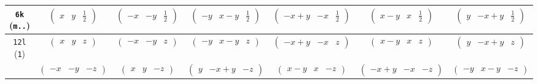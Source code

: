 \documentclass[fleqn,9pt,landscape]{jsarticle}
\begin{document}
\begin{center}
\begin{longtable}{ccccccc}
{\tt 6k} ({\tt m..}) & $ \begin{pmatrix} x & y & \frac{1}{2} \end{pmatrix} $ & $ \begin{pmatrix} - x & - y & \frac{1}{2} \end{pmatrix} $ & $ \begin{pmatrix} - y & x - y & \frac{1}{2} \end{pmatrix} $ & $ \begin{pmatrix} - x + y & - x & \frac{1}{2} \end{pmatrix} $ & $ \begin{pmatrix} x - y & x & \frac{1}{2} \end{pmatrix} $ & $ \begin{pmatrix} y & - x + y & \frac{1}{2} \end{pmatrix} $ \\ \hline
{\tt 12l} ({\tt 1}) & $ \begin{pmatrix} x & y & z \end{pmatrix} $ & $ \begin{pmatrix} - x & - y & z \end{pmatrix} $ & $ \begin{pmatrix} - y & x - y & z \end{pmatrix} $ & $ \begin{pmatrix} - x + y & - x & z \end{pmatrix} $ & $ \begin{pmatrix} x - y & x & z \end{pmatrix} $ & $ \begin{pmatrix} y & - x + y & z \end{pmatrix} $ \\
& $ \begin{pmatrix} - x & - y & - z \end{pmatrix} $ & $ \begin{pmatrix} x & y & - z \end{pmatrix} $ & $ \begin{pmatrix} y & - x + y & - z \end{pmatrix} $ & $ \begin{pmatrix} x - y & x & - z \end{pmatrix} $ & $ \begin{pmatrix} - x + y & - x & - z \end{pmatrix} $ & $ \begin{pmatrix} - y & x - y & - z \end{pmatrix} $ \\
\end{longtable}
\end{center}
\end{document}
